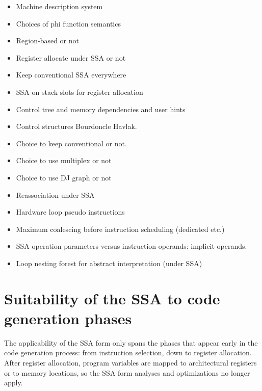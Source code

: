 \begin{itemize}

\item Machine description system

\item Choices of phi function semantics

\item Region-based or not

\item Register allocate under SSA or not

\item Keep conventional SSA everywhere

\item SSA on stack slots for register allocation

\item Control tree and memory dependencies and user hints

\item Control structures Bourdoncle Havlak.

\item Choice to keep conventional or not.

\item Choice to use multiplex or not

\item Choice to use DJ graph or not

\item Reassociation under SSA

\item Hardware loop pseudo instructions

\item Maximum coalescing before instruction scheduling (dedicated etc.)

\item SSA operation parameters versus instruction operands: implicit operands.

\item Loop nesting forest for abstract interpretation (under SSA)

\end{itemize}


\section{Suitability of the SSA to code generation phases}
\label{sec:ssa-codegen-suitability}

The applicability of the SSA form only spans the phases that appear
early in the code generation process: from instruction selection, down to
register allocation. After register allocation, program variables are mapped to
architectural registers or to memory locations, so the SSA form analyses and
optimizations no longer apply.

